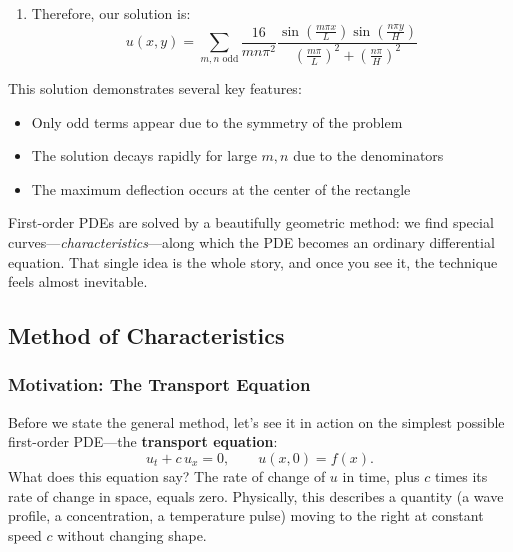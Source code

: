 \begin{example}
\begin{solution}
\begin{enumerate}
\item Therefore, our solution is:
   \[
   u(x,y) = \sum_{m,n \text{ odd}} \frac{16}{mn\pi^2}\frac{\sin(\frac{m\pi x}{L})\sin(\frac{n\pi y}{H})}{\left(\frac{m\pi}{L}\right)^2 + \left(\frac{n\pi}{H}\right)^2}
   \]
\end{enumerate}

\noindent This solution demonstrates several key features:
\begin{itemize}
   \item Only odd terms appear due to the symmetry of the problem
   \item The solution decays rapidly for large $m,n$ due to the denominators
   \item The maximum deflection occurs at the center of the rectangle
\end{itemize}
\end{solution}
\end{example}
\exampleline



\newpage

 

\noindent First-order PDEs are solved by a beautifully geometric method: we find special curves---\textit{characteristics}---along which the PDE becomes an ordinary differential equation. That single idea is the whole story, and once you see it, the technique feels almost inevitable. \\

\subsection*{Method of Characteristics} 

\subsubsection*{Motivation: The Transport Equation}

\noindent Before we state the general method, let's see it in action on the simplest possible first-order PDE---the \textbf{transport equation}:
\[
u_t + c\, u_x = 0, \qquad u(x,0) = f(x).
\]
What does this equation say? The rate of change of \( u \) in time, plus \( c \) times its rate of change in space, equals zero. Physically, this describes a quantity (a wave profile, a concentration, a temperature pulse) moving to the right at constant speed \( c \) without changing shape. \\

